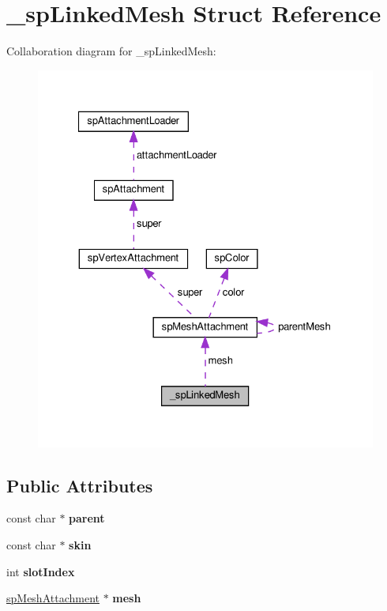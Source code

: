 \hypertarget{struct__spLinkedMesh}{}\section{\+\_\+sp\+Linked\+Mesh Struct Reference}
\label{struct__spLinkedMesh}


Collaboration diagram for \+\_\+sp\+Linked\+Mesh\+:
\nopagebreak
\begin{figure}[H]
\begin{center}
\leavevmode
\includegraphics[width=327pt]{struct__spLinkedMesh__coll__graph}
\end{center}
\end{figure}
\subsection*{Public Attributes}
\begin{DoxyCompactItemize}
\item 
\mbox{\label{struct__spLinkedMesh_a511febb06e6b24d690a9c6eec7b4f7f5}} 
const char $\ast$ {\bfseries parent}
\item 
\mbox{\label{struct__spLinkedMesh_ace7dfd8038178ea79dfa5a79c7929876}} 
const char $\ast$ {\bfseries skin}
\item 
\mbox{\label{struct__spLinkedMesh_a9a9bbd77397d0c6885563fd7d8526cb6}} 
int {\bfseries slot\+Index}
\item 
\mbox{\label{struct__spLinkedMesh_a1e01e633459ee8ab9f360e3f040240eb}} 
\hyperlink{structspMeshAttachment}{sp\+Mesh\+Attachment} $\ast$ {\bfseries mesh}
\end{DoxyCompactItemize}


